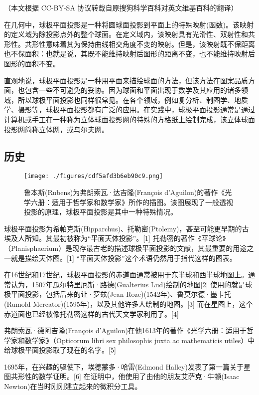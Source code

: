 
（本文根据 CC-BY-SA 协议转载自原搜狗科学百科对英文维基百科的翻译）

在几何中，球极平面投影是一种将圆球面投影到平面上的特殊映射(函数)。该映射的定义域为除投影点外的整个球面。在定义域内，该映射具有光滑性、双射性和共形性。共形性意味着其为保持曲线相交角度不变的映射。但是，该映射既不保距离也不保面积：也就是说，其既不能维持映射后图形的距离不变，也不能维持映射后图形的面积不变。

直观地说，球极平面投影是一种用平面来描绘球面的方法，但该方法在图案品质方面，也包含一些不可避免的妥协。因为球面和平面出现于数学及其应用的诸多领域，所以球极平面投影也同样很常见。在各个领域，例如复分析、制图学、地质学、摄影等，球极平面投影都有广泛的应用。在实践中，球极平面投影通常是通过计算机或手工在一种称为立体球面投影网的特殊的方格纸上绘制完成，该立体球面投影网简称立体网，或乌尔夫网。

\subsection{历史}
\begin{figure}[ht]
\centering
\texttt{[image: ./figures/cdf5afd3b6eb90c9.png]}
\caption{鲁本斯(Rubens)为弗朗索瓦·达吉隆(François d'Aguilon)的著作《光学六册：适用于哲学家和数学家》所作的插图。该图展现了一般透视投影的原理，球极平面投影是其中一种特殊情况。} \label{fig_QJPMTY_2}
\end{figure}
球极平面投影为希帕克斯(Hipparchus)、托勒密(Ptolemy)，甚至可能更早期的古埃及人所知。其最初被称为“平面天体投影”。[1] 托勒密的著作《平球论》（Planisphaerium）是现存最古老的描述球极平面投影的文献，其最重要的用途之一就是描绘天体图。[1] “平面天体投影”这个术语仍然用于指代这样的图表。

在16世纪和17世纪，球极平面投影的赤道面通常被用于东半球和西半球地图上。通常认为，1507年瓜尔特里厄斯·路德(Gualterius Lud)绘制的地图[2] 使用的就是球极平面投影，包括后来的让·罗兹(Jean Roze)(1542年)、鲁莫尔德·墨卡托(Rumold Mercator)(1595年)，以及其他许多人绘制的地图。[3] 而在星图上，这个赤道面也已经被像托勒密这样的古代天文学家利用了。[4]

弗朗索瓦·德阿吉隆(François d'Aguilon)在他1613年的著作《光学六册：适用于哲学家和数学家》（Opticorum libri sex philosophis juxta ac mathematicis utiles）中给球极平面投影取了现在的名字。[5]

1695年，在兴趣的驱使下，埃德蒙多·哈雷(Edmond Halley)发表了第一篇关于星图共形性的数学证明。[6] 在证明中，他使用了由他的朋友艾萨克·牛顿(Isaac Newton)在当时刚刚建立起来的微积分工具。

